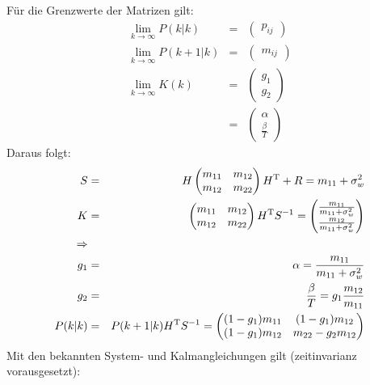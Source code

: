 Für die Grenzwerte der Matrizen gilt:
\begin{eqnarray*}
    \lim_{k \to \infty} P(k|k) &=& \begin{pmatrix} p_{ij} \end{pmatrix} \\
    \lim_{k \to \infty} P(k+1|k) &=& \begin{pmatrix} m_{ij} \end{pmatrix} \\
    \lim_{k \to \infty} K(k) &=& \begin{pmatrix} g_1 \\ g_2  \end{pmatrix} \\
        &=& \begin{pmatrix} \alpha \\ \frac{\beta}{T} \end{pmatrix}
\end{eqnarray*}
Daraus folgt:
\begin{eqnarray*}
    S &=& H
        \begin{pmatrix}
            m_{11} & m_{12} \\
            m_{12} & m_{22} 
        \end{pmatrix}
        H^\text{T} + R = m_{11} + \sigma_w^2 \\
    K &=&
        \begin{pmatrix}
            m_{11} & m_{12} \\
            m_{12} & m_{22}
        \end{pmatrix} H^\text{T} S^{-1} = 
        \begin{pmatrix}
            \frac{m_{11}}{m_{11} + \sigma_w^2} \\
            \frac{m_{12}}{m_{11} + \sigma_w^2}
        \end{pmatrix} \\
    \Rightarrow && \\
    g_1 &=& \alpha = \frac{m_{11}}{m_{11} + \sigma_w^2} \\
    g_2 &=& \frac{\beta}{T} = g_1 \frac{m_{12}}{m_{11}} \\
    P(k|k) &=& P(k+1|k) H^\text{T} S^{-1} = 
        \begin{pmatrix}
            (1-g_1) m_{11} & (1-g_1) m_{12} \\
            (1-g_1) m_{12} & m_{22} - g_2 m_{12}
        \end{pmatrix}
\end{eqnarray*}
Mit den bekannten System- und Kalmangleichungen gilt (zeitinvarianz vorausgesetzt):
